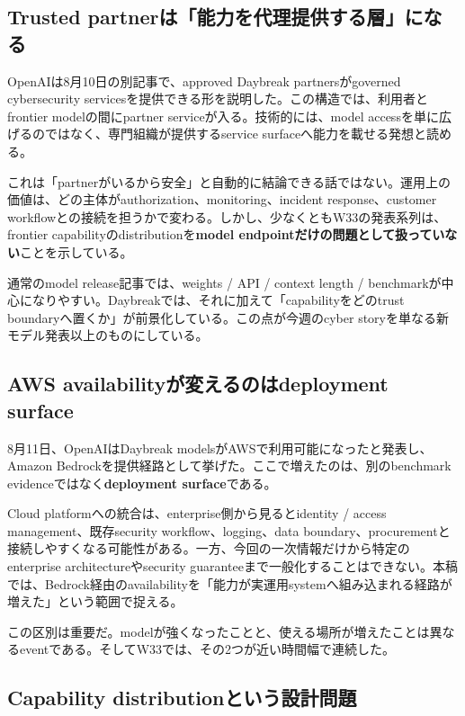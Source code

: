 \subsection*{Trusted partnerは「能力を代理提供する層」になる}

OpenAIは8月10日の別記事で、approved Daybreak partnersがgoverned cybersecurity servicesを提供できる形を説明した\cite{openai-daybreak-partners}。この構造では、利用者とfrontier modelの間にpartner serviceが入る。技術的には、model accessを単に広げるのではなく、専門組織が提供するservice surfaceへ能力を載せる発想と読める。

これは「partnerがいるから安全」と自動的に結論できる話ではない。運用上の価値は、どの主体がauthorization、monitoring、incident response、customer workflowとの接続を担うかで変わる。しかし、少なくともW33の発表系列は、frontier capabilityのdistributionを\textbf{model endpointだけの問題として扱っていない}ことを示している。

通常のmodel release記事では、weights / API / context length / benchmarkが中心になりやすい。Daybreakでは、それに加えて「capabilityをどのtrust boundaryへ置くか」が前景化している。この点が今週のcyber storyを単なる新モデル発表以上のものにしている。

\subsection*{AWS availabilityが変えるのはdeployment surface}

8月11日、OpenAIはDaybreak modelsがAWSで利用可能になったと発表し、Amazon Bedrockを提供経路として挙げた\cite{openai-daybreak-aws}。ここで増えたのは、別のbenchmark evidenceではなく\textbf{deployment surface}である。

Cloud platformへの統合は、enterprise側から見るとidentity / access management、既存security workflow、logging、data boundary、procurementと接続しやすくなる可能性がある。一方、今回の一次情報だけから特定のenterprise architectureやsecurity guaranteeまで一般化することはできない。本稿では、Bedrock経由のavailabilityを「能力が実運用systemへ組み込まれる経路が増えた」という範囲で捉える。

この区別は重要だ。modelが強くなったことと、使える場所が増えたことは異なるeventである。そしてW33では、その2つが近い時間幅で連続した。

\subsection*{Capability distributionという設計問題}

